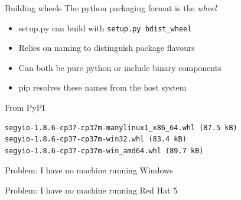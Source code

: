 \documentclass[pdf]{beamer}
\begin{document}
\begin{frame}[fragile]{Building wheels}
    The python packaging format is the \emph{wheel}

    \begin{block}{}
        \begin{itemize}
            \item setup.py can build with \verb|setup.py bdist_wheel|
            \item Relies on naming to distinguish package flavours
            \item Can both be pure python or include binary components
            \item pip resolves these names from the host system
        \end{itemize}
    \end{block}

    \begin{block}{From PyPI}
        \begin{verbatim}
segyio-1.8.6-cp37-cp37m-manylinux1_x86_64.whl (87.5 kB)
segyio-1.8.6-cp37-cp37m-win32.whl (83.4 kB)
segyio-1.8.6-cp37-cp37m-win_amd64.whl (89.7 kB)
        \end{verbatim}
    \end{block}

\end{frame}

\begin{frame}
    Problem: I have no machine running Windows
\end{frame}

\begin{frame}
    Problem: I have no machine running Red Hat 5

\end{frame}
\end{document}
